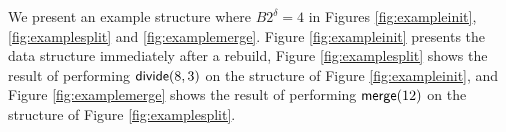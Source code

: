 


We present an example structure where $B2^{\delta}=4$ in Figures \ref{fig:exampleinit}, \ref{fig:examplesplit} and \ref{fig:examplemerge}. Figure \ref{fig:exampleinit} presents the data structure immediately after a rebuild, 
Figure \ref{fig:examplesplit} shows the result of performing $\mathsf{divide}(8,3)$ on the structure of Figure \ref{fig:exampleinit}, and 
Figure \ref{fig:examplemerge} shows the result of performing $\mathsf{merge}(12)$ on the structure of Figure \ref{fig:examplesplit}.

